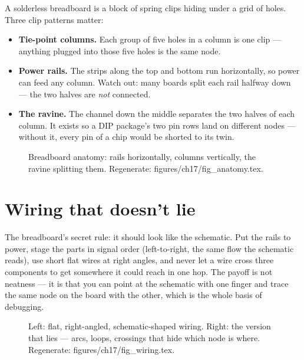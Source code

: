 A solderless breadboard is a block of spring clips hiding under a
grid of holes. Three clip patterns matter:

\begin{itemize}
\item \textbf{Tie-point columns.} Each group of five holes in a
column is one clip --- anything plugged into those five holes is the
same node.
\item \textbf{Power rails.} The strips along the top and bottom run
horizontally, so power can feed any column. Watch out: many boards
split each rail halfway down --- the two halves are \emph{not}
connected.
\item \textbf{The ravine.} The channel down the middle separates the
two halves of each column. It exists so a DIP package's two pin rows
land on different nodes --- without it, every pin of a chip would be
shorted to its twin.
\end{itemize}

\begin{figure}[htbp]
\centering

\caption{Breadboard anatomy: rails horizontally, columns vertically,
the ravine splitting them. Regenerate: \ttfamily
figures/ch17/fig\_anatomy.tex.}
\label{fig:anatomy17}
\end{figure}

\section{Wiring that doesn't lie}\label{sec:wiring17}

The breadboard's secret rule: it should look like the schematic.
Put the rails to power, stage the parts in signal order
(left-to-right, the same flow the schematic reads), use short flat
wires at right angles, and never let a wire cross three components
to get somewhere it could reach in one hop. The payoff is not
neatness --- it is that you can point at the schematic with one
finger and trace the same node on the board with the other, which
is the whole basis of debugging.

\begin{figure}[htbp]
\centering

\caption{Left: flat, right-angled, schematic-shaped wiring. Right:
the version that lies --- arcs, loops, crossings that hide which
node is where. Regenerate: \ttfamily figures/ch17/fig\_wiring.tex.}
\label{fig:wiring17}
\end{figure}

